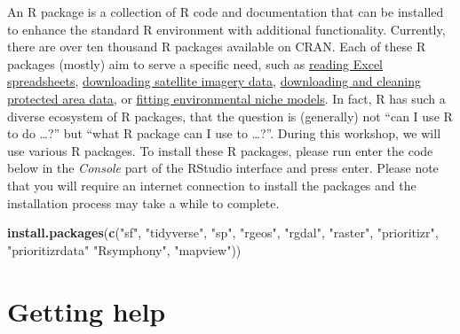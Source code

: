 \documentclass[]{book}
\newenvironment{Shaded}{\begin{snugshade}}{\end{snugshade}}
\newcommand{\KeywordTok}[1]{\textcolor[rgb]{0.13,0.29,0.53}{\textbf{#1}}}
\newcommand{\StringTok}[1]{\textcolor[rgb]{0.31,0.60,0.02}{#1}}
\newcommand{\NormalTok}[1]{#1}
\begin{document}
An R package is a collection of R code and documentation that can be
installed to enhance the standard R environment with additional
functionality. Currently, there are over ten thousand R packages
available on CRAN. Each of these R packages (mostly) aim to serve a
specific need, such as
\href{https://cran.r-project.org/web/packages/readxl/index.html}{reading
Excel spreadsheets},
\href{https://cran.r-project.org/web/packages/MODIStsp/index.html}{downloading
satellite imagery data},
\href{https://cran.r-project.org/web/packages/wdpar/index.html}{downloading
and cleaning protected area data}, or
\href{https://cran.r-project.org/web/packages/ENMeval/index.html}{fitting
environmental niche models}. In fact, R has such a diverse ecosystem of
R packages, that the question is (generally) not ``can I use R to do
\ldots{}?'' but ``what R package can I use to \ldots{}?''. During this
workshop, we will use various R packages. To install these R packages,
please run enter the code below in the \emph{Console} part of the
RStudio interface and press enter. Please note that you will require an
internet connection to install the packages and the installation process
may take a while to complete.

\begin{Shaded}
\begin{Highlighting}[]
\KeywordTok{install.packages}\NormalTok{(}\KeywordTok{c}\NormalTok{(}\StringTok{"sf"}\NormalTok{, }\StringTok{"tidyverse"}\NormalTok{, }\StringTok{"sp"}\NormalTok{, }\StringTok{"rgeos"}\NormalTok{, }\StringTok{"rgdal"}\NormalTok{, }\StringTok{"raster"}\NormalTok{,}
                   \StringTok{"prioritizr"}\NormalTok{, }\StringTok{"prioritizrdata"} \StringTok{"Rsymphony"}\NormalTok{, }\StringTok{"mapview"}\NormalTok{))}
\end{Highlighting}
\end{Shaded}

\section{Getting help}\label{getting-help}
\end{document}
